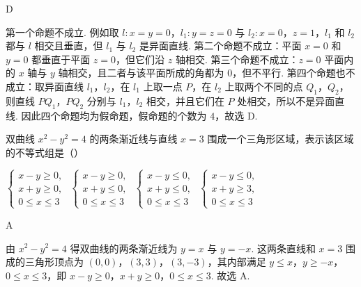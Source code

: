 \begin{answer}
D
\end{answer}

\begin{solution}
第一个命题不成立. 例如取 \(l\colon x=y=0\)，\(l_{1}\colon y=z=0\) 与 \(l_{2}\colon x=0\)，\(z=1\)，\(l_{1}\) 和 \(l_{2}\) 都与 \(l\) 相交且垂直，但 \(l_{1}\) 与 \(l_{2}\) 是异面直线. 第二个命题不成立：平面 \(x=0\) 和 \(y=0\) 都垂直于平面 \(z=0\)，但它们沿 \(z\) 轴相交. 第三个命题不成立：\(z=0\) 平面内的 \(x\) 轴与 \(y\) 轴相交，且二者与该平面所成的角都为 \(0\)，但不平行. 第四个命题也不成立：取异面直线 \(l_{1}\)，\(l_{2}\)，在 \(l_{1}\) 上取一点 \(P\)，在 \(l_{2}\) 上取两个不同的点 \(Q_{1}\)，\(Q_{2}\)，则直线 \(PQ_{1}\)，\(PQ_{2}\) 分别与 \(l_{1}\)，\(l_{2}\) 相交，并且它们在 \(P\) 处相交，所以不是异面直线. 因此四个命题均为假命题，假命题的个数为 \(4\)，故选 D.
\end{solution}

\begin{problem}
双曲线 \( x^{2}-y^{2}=4 \) 的两条渐近线与直线 \(x=3\) 围成一个三角形区域，表示该区域的不等式组是（\quad）

\choices
    {\(\begin{cases}
x - y \geqslant 0,\\
x + y \geqslant 0,\\
0 \leqslant x \leqslant 3
\end{cases}\)}
    {\(\begin{cases}
x - y \geqslant 0,\\
x + y \leqslant 0,\\
0 \leqslant x \leqslant 3
\end{cases}\)}
    {\(\begin{cases}
x - y \leqslant 0,\\
x + y \leqslant 0,\\
0 \leqslant x \leqslant 3
\end{cases}\)}
    {\(\begin{cases}
x - y \leqslant 0,\\
x + y \geqslant 3,\\
0 \leqslant x \leqslant 3
\end{cases}\)}
\end{problem}

\begin{answer}
A
\end{answer}

\begin{solution}
由 \(x^2-y^2=4\) 得双曲线的两条渐近线为 \(y=x\) 与 \(y=-x\). 这两条直线和 \(x=3\) 围成的三角形顶点为 \((0,0)\)，\((3,3)\)，\((3,-3)\)，其内部满足 \(y\leqslant x\)，\(y\geqslant -x\)，\(0\leqslant x\leqslant3\)，即 \(x-y\geqslant0\)，\(x+y\geqslant0\)，\(0\leqslant x\leqslant3\). 故选 A.
\end{solution}

